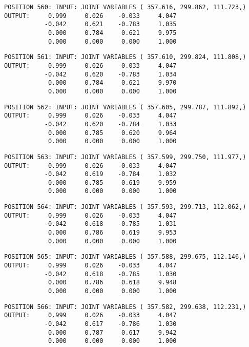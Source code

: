 \begin{verbatim}
POSITION 560: INPUT: JOINT VARIABLES ( 357.616, 299.862, 111.723,)
OUTPUT:     0.999     0.026    -0.033     4.047
           -0.042     0.621    -0.783     1.035
            0.000     0.784     0.621     9.975
            0.000     0.000     0.000     1.000
\end{verbatim} \pagebreak[1]\begin{verbatim}
POSITION 561: INPUT: JOINT VARIABLES ( 357.610, 299.824, 111.808,)
OUTPUT:     0.999     0.026    -0.033     4.047
           -0.042     0.620    -0.783     1.034
            0.000     0.784     0.621     9.970
            0.000     0.000     0.000     1.000
\end{verbatim} \pagebreak[1]\begin{verbatim}
POSITION 562: INPUT: JOINT VARIABLES ( 357.605, 299.787, 111.892,)
OUTPUT:     0.999     0.026    -0.033     4.047
           -0.042     0.620    -0.784     1.033
            0.000     0.785     0.620     9.964
            0.000     0.000     0.000     1.000
\end{verbatim} \pagebreak[1]\begin{verbatim}
POSITION 563: INPUT: JOINT VARIABLES ( 357.599, 299.750, 111.977,)
OUTPUT:     0.999     0.026    -0.033     4.047
           -0.042     0.619    -0.784     1.032
            0.000     0.785     0.619     9.959
            0.000     0.000     0.000     1.000
\end{verbatim} \pagebreak[1]\begin{verbatim}
POSITION 564: INPUT: JOINT VARIABLES ( 357.593, 299.713, 112.062,)
OUTPUT:     0.999     0.026    -0.033     4.047
           -0.042     0.618    -0.785     1.031
            0.000     0.786     0.619     9.953
            0.000     0.000     0.000     1.000
\end{verbatim} \pagebreak[1]\begin{verbatim}
POSITION 565: INPUT: JOINT VARIABLES ( 357.588, 299.675, 112.146,)
OUTPUT:     0.999     0.026    -0.033     4.047
           -0.042     0.618    -0.785     1.030
            0.000     0.786     0.618     9.948
            0.000     0.000     0.000     1.000
\end{verbatim} \pagebreak[1]\begin{verbatim}
POSITION 566: INPUT: JOINT VARIABLES ( 357.582, 299.638, 112.231,)
OUTPUT:     0.999     0.026    -0.033     4.047
           -0.042     0.617    -0.786     1.030
            0.000     0.787     0.617     9.942
            0.000     0.000     0.000     1.000
\end{verbatim} \pagebreak[1]\begin{verbatim}

\end{verbatim}
